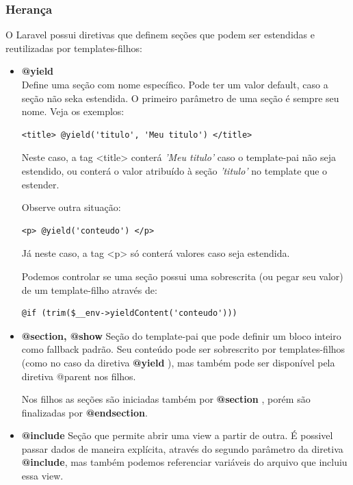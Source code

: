 \documentclass[
12pt,				%
openany,			%
twoside,			%
a4paper,			%
english,			%
french,				%
spanish,			%
brazil,				%
]{abntex2}
\begin{document}
\subsubsection{Herança}
O Laravel possui diretivas que definem seções que podem ser estendidas e reutilizadas por templates-filhos:
\begin{itemize}
    \item \textbf{@yield} \\
        Define uma seção com nome específico. Pode ter um valor default, caso a seção não seka estendida. O primeiro parâmetro de uma seção é sempre seu nome. Veja os exemplos: 

        \begin{lstlisting}[style=common,caption={Valor default usando \textit{@yield}}]
    <title> @yield('titulo', 'Meu titulo') </title>
\end{lstlisting}

Neste caso, a tag <title> conterá \textit{'Meu titulo'} caso o template-pai não seja estendido, ou conterá o valor atribuído à seção \textit{'titulo'} no template que o estender.

Observe outra situação:
\begin{lstlisting}[style=common,caption={\textit{@yield} sem valor default}]
    <p> @yield('conteudo') </p>
\end{lstlisting}

Já neste caso, a tag <p> só conterá valores caso seja estendida.

Podemos controlar se uma seção possui uma sobrescrita (ou pegar seu valor) de um template-filho através de:

\begin{lstlisting}[style=common,caption={Controlando sobrescrita}]
    @if (trim($__env->yieldContent('conteudo')))
\end{lstlisting}

    \item \textbf{@section, @show}
        Seção do template-pai que pode definir um bloco inteiro como fallback padrão. Seu conteúdo pode ser sobrescrito por templates-filhos (como no caso da diretiva
        \textbf{@yield} ), mas também pode ser disponível pela diretiva @parent nos filhos.

        Nos filhos as seções são iniciadas também por \textbf{@section} , porém são finalizadas por \textbf{@endsection}.

    \item \textbf{@include}
        Seção que permite abrir uma view a partir de outra. É possivel passar dados de maneira explícita, através do segundo parâmetro da diretiva \textbf{@include}, mas também podemos referenciar variáveis do arquivo
        que incluiu essa view.


\end{itemize}
\end{document}
